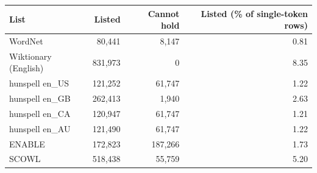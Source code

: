 \begin{tabular}{lrrr}
\toprule
List & Listed & Cannot hold & Listed (\% of single-token rows) \\
\midrule
WordNet & 80,441 & 8,147 & 0.81 \\
Wiktionary (English) & 831,973 & 0 & 8.35 \\
hunspell en\_US & 121,252 & 61,747 & 1.22 \\
hunspell en\_GB & 262,413 & 1,940 & 2.63 \\
hunspell en\_CA & 120,947 & 61,747 & 1.21 \\
hunspell en\_AU & 121,490 & 61,747 & 1.22 \\
ENABLE & 172,823 & 187,266 & 1.73 \\
SCOWL & 518,438 & 55,759 & 5.20 \\
\bottomrule
\end{tabular}
